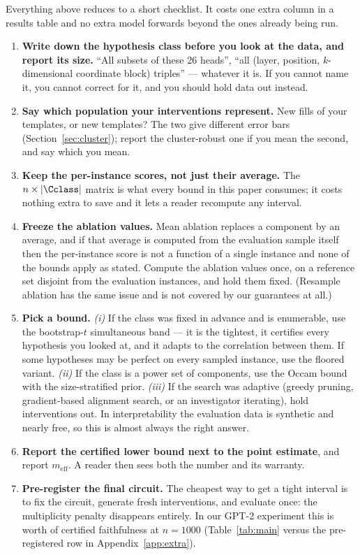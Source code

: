 Everything above reduces to a short checklist. It costs one extra column in a
results table and no extra model forwards beyond the ones already being run.

\begin{enumerate}\itemsep3pt
\item \textbf{Write down the hypothesis class before you look at the data, and
report its size.} ``All subsets of these 26 heads'', ``all (layer, position,
$k$-dimensional coordinate block) triples'' --- whatever it is. If you cannot
name it, you cannot correct for it, and you should hold data out instead.

\item \textbf{Say which population your interventions represent.} New fills of
your templates, or new templates? The two give different error bars
(Section~\ref{sec:cluster}); report the cluster-robust one if you mean the
second, and say which you mean.

\item \textbf{Keep the per-instance scores, not just their average.} The
$n\times|\Cclass|$ matrix is what every bound in this paper consumes; it costs
nothing extra to save and it lets a reader recompute any interval.

\item \textbf{Freeze the ablation values.} Mean ablation replaces a component by
an average, and if that average is computed from the evaluation sample itself
then the per-instance score is not a function of a single instance and none of
the bounds apply as stated. Compute the ablation values once, on a reference set
disjoint from the evaluation instances, and hold them fixed. (Resample ablation
has the same issue and is not covered by our guarantees at all.)

\item \textbf{Pick a bound.}
\emph{(i)} If the class was fixed in advance and is enumerable, use the
bootstrap-$t$ simultaneous band --- it is the tightest, it certifies every
hypothesis you looked at, and it adapts to the correlation between them. If some
hypotheses may be perfect on every sampled instance, use the floored variant.
\emph{(ii)} If the class is a power set of components, use the Occam bound with
the size-stratified prior.
\emph{(iii)} If the search was adaptive (greedy pruning, gradient-based alignment
search, or an investigator iterating), hold interventions out. In
interpretability the evaluation data is synthetic and nearly free, so this is
almost always the right answer.

\item \textbf{Report the certified lower bound next to the point estimate}, and
report $m_{\mathrm{eff}}$. A reader then sees both the number and its warranty.

\item \textbf{Pre-register the final circuit.} The cheapest way to get a tight
interval is to fix the circuit, generate fresh interventions, and evaluate once:
the multiplicity penalty disappears entirely. In our GPT-2 experiment this is
worth \MyPreRegGain{} of certified faithfulness at $n=1000$
(Table~\ref{tab:main} versus the pre-registered row in
Appendix~\ref{app:extra}).
\end{enumerate}
